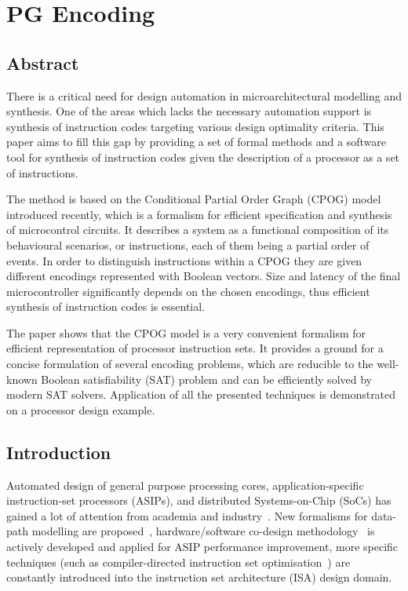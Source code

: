 \section{PG Encoding}

\subsection{Abstract}
There is a critical need for design automation in microarchitectural
modelling and synthesis. One of the areas which lacks the necessary
automation support is synthesis of instruction codes targeting various
design optimality criteria. This paper aims to fill this gap by providing
a set of formal methods and a software tool for synthesis of instruction
codes given the description of a processor as a set of instructions.

The method is based on the Conditional Partial Order Graph (CPOG)
model introduced recently, which is a formalism for efficient specification
and synthesis of microcontrol circuits. It describes a system as a
functional composition of its behavioural scenarios, or instructions,
each of them being a partial order of events. In order to distinguish
instructions within a CPOG they are given different encodings represented
with Boolean vectors. Size and latency of the final microcontroller
significantly depends on the chosen encodings, thus efficient synthesis
of instruction codes is essential.

The paper shows that the CPOG model is a very convenient formalism
for efficient representation of processor instruction sets. It provides
a ground for a concise formulation of several encoding problems, which
are reducible to the well-known Boolean satisfiability (SAT) problem
and can be efficiently solved by modern SAT solvers. Application of
all the presented techniques is demonstrated on a processor design
example.

\subsection{Introduction}

Automated design of general purpose processing cores, application-specific
instruction-set processors (ASIPs), and distributed Systems-on-Chip
(SoCs) has gained a lot of attention from academia and industry~\cite{2006_dutt_chapter}.
New formalisms for data-path modelling are proposed~\cite{2010_mokhov_ieee}\cite{2008_sokolov_sdfs},
hardware/software co-design methodology~\cite{1993_alomary_edac}
is actively developed and applied for ASIP performance improvement,
more specific techniques (such as compiler-directed instruction set
optimisation~\cite{2002_qin_date}) are constantly introduced into
the instruction set architecture (ISA) design domain.


